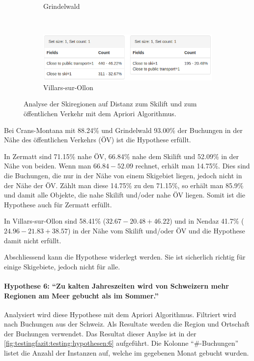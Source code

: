 \begin{figure}[H]
\begin{subfigure}[t]{0.8\textwidth}
		\caption{Grindelwald}
		\label{sec:testingfazit:testing:hypothesen:5:4}
	\end{subfigure} \\
	\begin{subfigure}[t]{0.8\textwidth}
		\centering
		\includegraphics[width=1\textwidth]{images/hypothese5-villars}
		\caption{Villars-sur-Ollon}
		\label{sec:testingfazit:testing:hypothesen:5:5}
	\end{subfigure}
	\caption{Analyse der Skiregionen auf Distanz zum Skilift und zum öffentlichen Verkehr mit dem Apriori Algorithmus.}
	\label{sec:testingfazit:testing:hypothesen:5}
\end{figure}

Bei Crans-Montana mit 88.24\% und Grindelwald 93.00\% der Buchungen in der Nähe des öffentlichen Verkehrs (ÖV) ist die Hypothese erfüllt. 

In Zermatt sind 71.15\% nahe ÖV, 66.84\% nahe dem Skilift und 52.09\% in der Nähe von beiden. Wenn man $66.84 - 52.09$ rechnet, erhält man 14.75\%. Dies sind die Buchungen, die nur in der Nähe von einem Skigebiet liegen, jedoch nicht in der Nähe der ÖV. Zählt man diese 14.75\% zu den 71.15\%, so erhält man 85.9\% und damit alle Objekte, die nahe Skilift und/oder nahe ÖV liegen. Somit ist die Hypothese auch für Zermatt erfüllt.

In Villars-sur-Ollon sind 58.41\% ($32.67-20.48+46.22$)  und in Nendaz 41.7\% ($24.96-21.83+38.57$) in der Nähe vom Skilift und/oder ÖV und die Hypothese damit nicht erfüllt.

Abschliessend kann die Hypothese widerlegt werden. Sie ist sicherlich richtig für einige Skigebiete, jedoch nicht für alle.

\paragraph{Hypothese 6: "`Zu kalten Jahreszeiten wird von Schweizern mehr Regionen am Meer gebucht als im Sommer."'} Analysiert wird diese Hypothese mit dem Apriori Algorithmus. Filtriert wird nach Buchungen aus der Schweiz. Als Resultate werden die Region und Ortschaft der Buchungen verwendet. Das Resultat dieser Anylse ist in der \cref{fig:testingfazit:testing:hypothesen:6} aufgeführt. Die Kolonne "`\#-Buchungen"' listet die Anzahl der Instanzen auf, welche im gegebenen Monat gebucht wurden.


